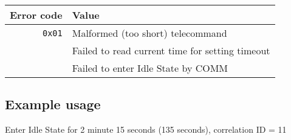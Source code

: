 \begin{tabular}{r | l}
	Error code & Value \\
	\hline
	\texttt{0x01} & Malformed (too short) telecommand \\ 
	 			  & Failed to read current time for setting timeout \\
				  & Failed to enter Idle State by COMM
	
\end{tabular}

\subsection{Example usage}
Enter Idle State for 2 minute 15 seconds (135 seconds), correlation ID = 11
